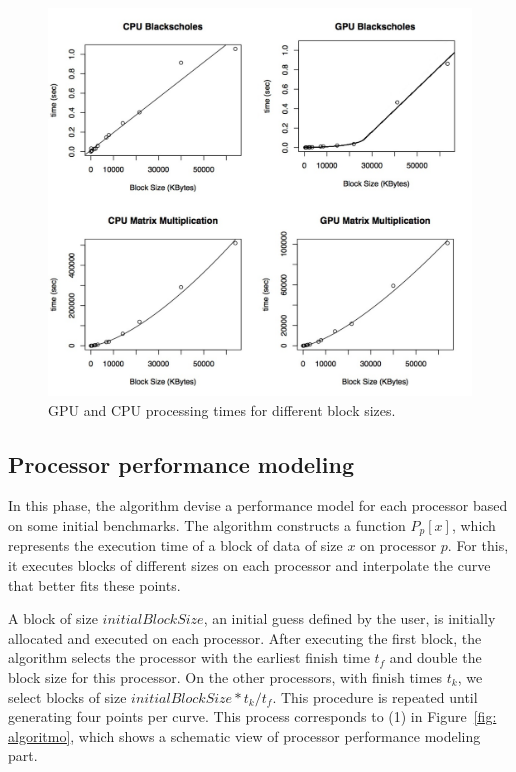 \documentclass[journal]{IEEEtran}
\begin{document}
\begin{figure}[!t]
	\centering
			\includegraphics[scale=0.25]{CPUVersusGPULinear2_Ajustado.pdf} 				
	\caption{GPU and CPU processing times for different block sizes.}
	\label{fig: CPUVersusGPU1}
\end{figure}


\subsection{Processor performance modeling}

In this phase, the algorithm devise a performance model for each processor based on some initial benchmarks. The algorithm 
constructs a function $P_p[x]$, which represents the execution time of a block
of data of size $x$ on processor $p$. For this, it executes blocks of different
sizes on each processor and interpolate the curve that better fits these points.

A block of size $initialBlockSize$, an initial guess defined by the user, is initially allocated
and executed on each processor. After executing the first block, the algorithm
selects the processor with the earliest finish time $t_f$ and double the block
size for this processor. On the other processors, with finish times $t_k$, we
select blocks of size $initialBlockSize * t_k / t_f$. This procedure is repeated
until generating four points per curve. This process corresponds to (1) in
Figure~\ref{fig: algoritmo}, which shows a schematic view of processor
performance modeling part.
\end{document}
